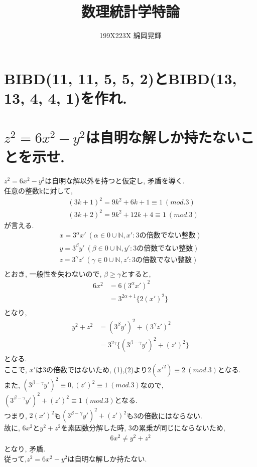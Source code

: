 \documentclass[uplatex]{jsarticle}
\title{\huge 数理統計学特論}
\author{199X223X 綿岡晃輝}
\affil{神戸大学大学院 システム情報学研究科 計算科学専攻}
\date{}
\begin{document}
    \maketitle
    \newpage
    
    \section{BIBD(11, 11, 5, 5, 2)とBIBD(13, 13, 4, 4, 1)を作れ.}

    \newpage

    \section{$z^2=6x^2-y^2$は自明な解しか持たないことを示せ.}
    \noindent
    $z^2=6x^2-y^2$は自明な解以外を持つと仮定し, 矛盾を導く. \\
    任意の整数kに対して, \\
    \begin{eqnarray}
        & (3k+1)^2 = 9k^2 + 6k + 1  \equiv 1\ (mod.3) \\
        & (3k+2)^2 = 9k^2 + 12k + 4  \equiv 1\ (mod.3)
    \end{eqnarray}
    が言える. \\
    \begin{align*}
        x=3^\alpha x' \ (\alpha \in {0} \cup \mathbb{N}, x':3の倍数でない整数) \\
        y=3^\beta y' \ (\beta \in {0} \cup \mathbb{N}, y':3の倍数でない整数) \\
        z=3^\gamma z' \ (\gamma \in {0} \cup \mathbb{N}, z':3の倍数でない整数) \\
    \end{align*}
    とおき, 一般性を失わないので, $\beta \geq \gamma$とすると,
    \begin{align*}
        6x^2 &= 6(3^\alpha x')^2 \\
        &= 3^{2\alpha + 1}\{2(x')^2\} \\
    \end{align*}
    となり, 
    \begin{align*}
        y^2 + z^2 &= (3^{\beta}y')^2 + (3^{\gamma}z')^2 \\
        &= 3^{2\gamma} \{(3^{\beta - \gamma}y')^2 + (z')^2\}
    \end{align*}
    となる. \\
    ここで, $x'$は3の倍数ではないため, (1),(2)より$2(x'^2) \equiv 2\ (mod.3)$となる. \\
    また, $(3^{\beta - \gamma}y')^2 \equiv 0, (z')^2 \equiv 1\ (mod.3)$なので,
    $(3^{\beta - \gamma}y')^2 + (z')^2 \equiv 1\ (mod.3)$となる.\\
    つまり, $2(x')^2$も$(3^{\beta - \gamma}y')^2 + (z')^2$も3の倍数にはならない. \\
    故に, $6x^2$と$y^2+z^2$を素因数分解した時, 3の累乗が同じにならないため, 
    \begin{align*}
        6x^2 \neq y^2 + z^2 
    \end{align*}
    となり, 矛盾. \\
    \noindent
    従って,$z^2=6x^2-y^2$は自明な解しか持たない.
\end{document}
